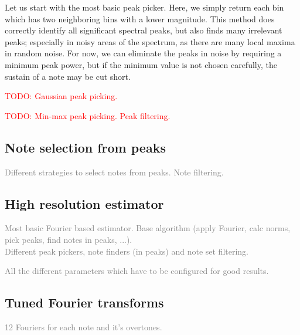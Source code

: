 \documentclass[10pt,twocolumn]{article}
\begin{document}
Let us start with the most basic peak picker. Here, we simply return each bin which has two neighboring bins with a lower magnitude. This method does correctly identify all significant spectral peaks, but also finds many irrelevant peaks; especially in noisy areas of the spectrum, as there are many local maxima in random noise. For now, we can eliminate the peaks in noise by requiring a minimum peak power, but if the minimum value is not chosen carefully, the sustain of a note may be cut short.

\textcolor{red}{TODO: Gaussian peak picking.}

\textcolor{red}{TODO: Min-max peak picking. Peak filtering.}


\subsection{Note selection from peaks}
\textcolor{gray}{Different strategies to select notes from peaks. Note filtering.}


\subsection{High resolution estimator}  \label{sec:highrespitch}
\textcolor{gray}{Most basic Fourier based estimator. Base algorithm (apply Fourier, calc norms, pick peaks, find notes in peaks, ...).\\
Different peak pickers, note finders (in peaks) and note set filtering.}

\textcolor{gray}{All the different parameters which have to be configured for good results.}


\subsection{Tuned Fourier transforms}
\textcolor{gray}{12 Fouriers for each note and it's overtones.}
\end{document}
